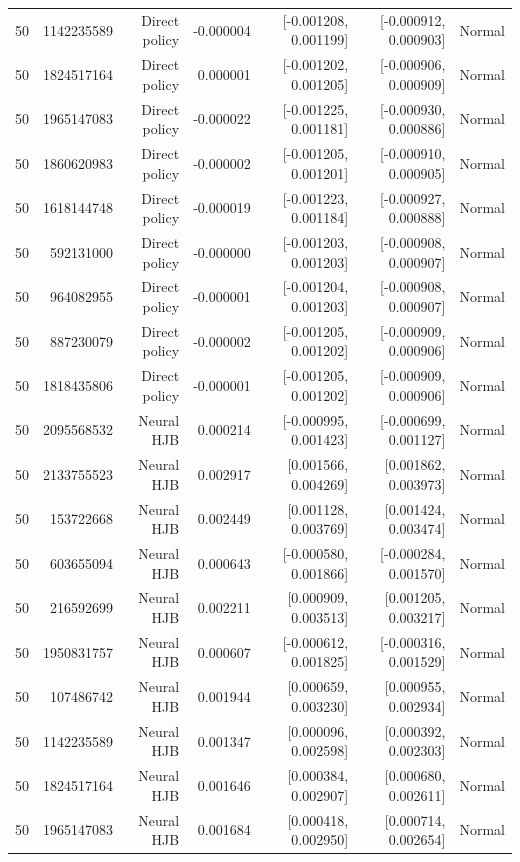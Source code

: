 \begin{longtable}{lrrrrrr}
50 & 1142235589 & Direct policy & -0.000004 & [-0.001208, 0.001199] & [-0.000912, 0.000903] & Normal \\
50 & 1824517164 & Direct policy & 0.000001 & [-0.001202, 0.001205] & [-0.000906, 0.000909] & Normal \\
50 & 1965147083 & Direct policy & -0.000022 & [-0.001225, 0.001181] & [-0.000930, 0.000886] & Normal \\
50 & 1860620983 & Direct policy & -0.000002 & [-0.001205, 0.001201] & [-0.000910, 0.000905] & Normal \\
50 & 1618144748 & Direct policy & -0.000019 & [-0.001223, 0.001184] & [-0.000927, 0.000888] & Normal \\
50 & 592131000 & Direct policy & -0.000000 & [-0.001203, 0.001203] & [-0.000908, 0.000907] & Normal \\
50 & 964082955 & Direct policy & -0.000001 & [-0.001204, 0.001203] & [-0.000908, 0.000907] & Normal \\
50 & 887230079 & Direct policy & -0.000002 & [-0.001205, 0.001202] & [-0.000909, 0.000906] & Normal \\
50 & 1818435806 & Direct policy & -0.000001 & [-0.001205, 0.001202] & [-0.000909, 0.000906] & Normal \\
50 & 2095568532 & Neural HJB & 0.000214 & [-0.000995, 0.001423] & [-0.000699, 0.001127] & Normal \\
50 & 2133755523 & Neural HJB & 0.002917 & [0.001566, 0.004269] & [0.001862, 0.003973] & Normal \\
50 & 153722668 & Neural HJB & 0.002449 & [0.001128, 0.003769] & [0.001424, 0.003474] & Normal \\
50 & 603655094 & Neural HJB & 0.000643 & [-0.000580, 0.001866] & [-0.000284, 0.001570] & Normal \\
50 & 216592699 & Neural HJB & 0.002211 & [0.000909, 0.003513] & [0.001205, 0.003217] & Normal \\
50 & 1950831757 & Neural HJB & 0.000607 & [-0.000612, 0.001825] & [-0.000316, 0.001529] & Normal \\
50 & 107486742 & Neural HJB & 0.001944 & [0.000659, 0.003230] & [0.000955, 0.002934] & Normal \\
50 & 1142235589 & Neural HJB & 0.001347 & [0.000096, 0.002598] & [0.000392, 0.002303] & Normal \\
50 & 1824517164 & Neural HJB & 0.001646 & [0.000384, 0.002907] & [0.000680, 0.002611] & Normal \\
50 & 1965147083 & Neural HJB & 0.001684 & [0.000418, 0.002950] & [0.000714, 0.002654] & Normal \\

\end{longtable}
